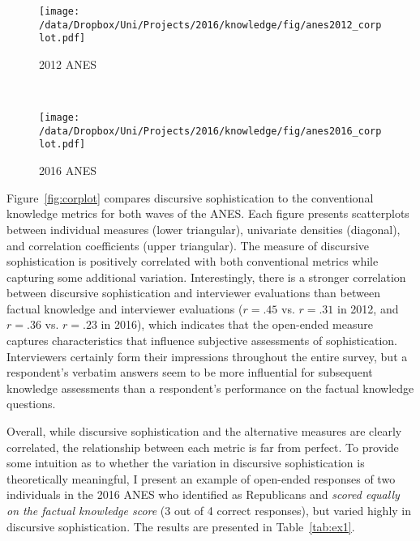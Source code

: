 \begin{figure*}[h]
    \centering
    \begin{subfigure}[t]{0.5\textwidth}
        \centering
        \texttt{[image: /data/Dropbox/Uni/Projects/2016/knowledge/fig/anes2012\_corplot.pdf]}
        \caption{2012 ANES}
    \end{subfigure}%
    ~ 
    \begin{subfigure}[t]{0.5\textwidth}
        \centering
        \texttt{[image: /data/Dropbox/Uni/Projects/2016/knowledge/fig/anes2016\_corplot.pdf]}
        \caption{2016 ANES}
    \end{subfigure}
    \caption[Correlation matrix of discursive sophistication and conventional political knowledge metrics]{Correlation matrix of discursive sophistication and conventional political knowledge metrics. The plots on the diagonal display univariate densities for each variable. The panels in the lower triangular display the scatter plot of two measures as well as a linear fit. The upper triangular displays the correlation coefficient. All correlations reported are statistically significant with $p<.05$.}\label{fig:corplot}
\end{figure*}

Figure~\ref{fig:corplot} compares discursive sophistication to the conventional knowledge metrics for both waves of the ANES. Each figure presents scatterplots between individual measures (lower triangular), univariate densities (diagonal), and correlation coefficients (upper triangular). The measure of discursive sophistication is positively correlated with both conventional metrics while capturing some additional variation. Interestingly, there is a stronger correlation between discursive sophistication and interviewer evaluations than between factual knowledge and interviewer evaluations ($r=.45$ vs. $r=.31$ in 2012, and $r=.36$ vs. $r=.23$ in 2016), which indicates that the open-ended measure captures characteristics that influence subjective assessments of sophistication. Interviewers certainly form their impressions throughout the entire survey, but a respondent's verbatim answers seem to be more influential for subsequent knowledge assessments than a respondent's performance on the factual knowledge questions.

Overall, while discursive sophistication and the alternative measures are clearly correlated, the relationship between each metric is far from perfect. To provide some intuition as to whether the variation in discursive sophistication is theoretically meaningful, I present an example of open-ended responses of two individuals in the 2016 ANES who identified as Republicans and \textit{scored equally on the factual knowledge score} (3 out of 4 correct responses), but varied highly in discursive sophistication. The results are presented in Table~\ref{tab:ex1}.


